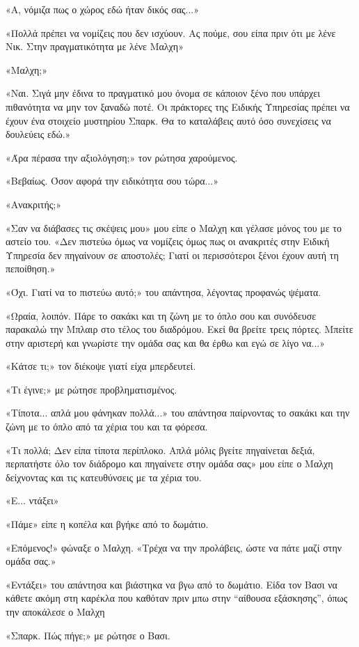 \documentclass[12pt,twoside, openany]{book}
\begin{document}
«Α, νόμιζα πως ο χώρος εδώ ήταν δικός σας...»

«Πολλά πρέπει να νομίζεις που δεν ισχύουν. Ας πούμε, σου είπα πριν ότι με λένε Νικ. Στην πραγματικότητα με λένε Μαλχη»

«Μαλχη;»

«Ναι. Σιγά μην έδινα το πραγματικό μου όνομα σε κάποιον ξένο που υπάρχει πιθανότητα να μην τον ξαναδώ ποτέ. Οι πράκτορες της Ειδικής Υπηρεσίας πρέπει να έχουν ένα στοιχείο μυστηρίου Σπαρκ. Θα το καταλάβεις αυτό όσο συνεχίσεις να δουλεύεις εδώ.»

«Άρα πέρασα την αξιολόγηση;» τον ρώτησα χαρούμενος.

«Βεβαίως. Όσον αφορά την ειδικότητα σου τώρα...»

«Ανακριτής;»

«Σαν να διάβασες τις σκέψεις μου» μου είπε ο Μαλχη και γέλασε μόνος του με το αστείο του. «Δεν πιστεύω όμως να νομίζεις όμως πως οι ανακριτές στην Ειδική Υπηρεσία δεν πηγαίνουν σε αποστολές; Γιατί οι περισσότεροι ξένοι έχουν αυτή τη πεποίθηση.»

«Όχι. Γιατί να το πιστεύω αυτό;» του απάντησα, λέγοντας προφανώς ψέματα.

«Ωραία, λοιπόν. Πάρε το σακάκι και τη ζώνη με το όπλο σου και συνόδευσε παρακαλώ την Μπλαιρ στο τέλος του διαδρόμου. Εκεί θα βρείτε τρεις πόρτες. Μπείτε στην αριστερή και γνωρίστε την ομάδα σας και θα έρθω και εγώ σε λίγο να...»

«Κάτσε τι;» τον διέκοψε γιατί είχα μπερδευτεί.

«Τι έγινε;» με ρώτησε προβληματισμένος.

«Τίποτα... απλά μου φάνηκαν πολλά...» του απάντησα παίρνοντας το σακάκι και την ζώνη με το όπλο από τα χέρια του και τα φόρεσα.

«Τι πολλά; Δεν είπα τίποτα περίπλοκο. Απλά μόλις βγείτε πηγαίνεται δεξιά, περπατήστε όλο τον διάδρομο και πηγαίνετε στην ομάδα σας» μου είπε ο Μαλχη δείχνοντας και τις κατευθύνσεις με τα χέρια του.

«Ε... ντάξει»

«Πάμε» είπε η κοπέλα και βγήκε από το δωμάτιο.

«Επόμενος!» φώναξε ο Μαλχη. «Τρέχα να την προλάβεις, ώστε να πάτε μαζί στην ομάδα σας.»

«Εντάξει» του απάντησα και βιάστηκα να βγω από το δωμάτιο. Είδα τον Βασι να κάθετε ακόμη στη καρέκλα που καθόταν πριν μπω στην “αίθουσα εξάσκησης”, όπως την αποκάλεσε ο Μαλχη

«Σπαρκ. Πώς πήγε;» με ρώτησε ο Βασι.
\end{document}
